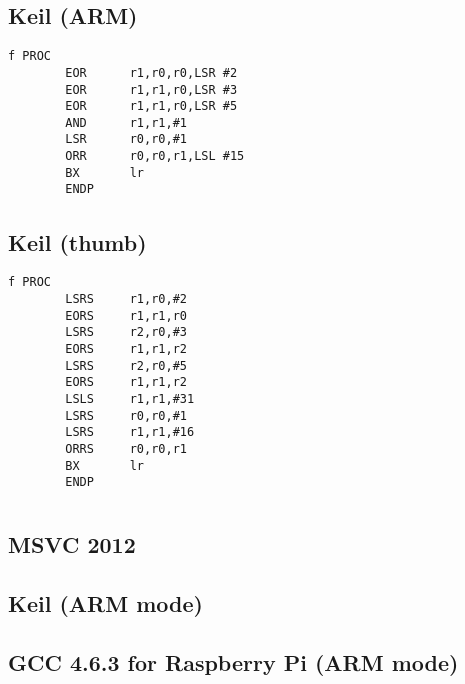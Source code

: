 \subsection{Keil (ARM)}

\begin{lstlisting}
f PROC
        EOR      r1,r0,r0,LSR #2
        EOR      r1,r1,r0,LSR #3
        EOR      r1,r1,r0,LSR #5
        AND      r1,r1,#1
        LSR      r0,r0,#1
        ORR      r0,r0,r1,LSL #15
        BX       lr
        ENDP
\end{lstlisting}

\subsection{Keil (thumb)}

\begin{lstlisting}
f PROC
        LSRS     r1,r0,#2
        EORS     r1,r1,r0
        LSRS     r2,r0,#3
        EORS     r1,r1,r2
        LSRS     r2,r0,#5
        EORS     r1,r1,r2
        LSLS     r1,r1,#31
        LSRS     r0,r0,#1
        LSRS     r1,r1,#16
        ORRS     r0,r0,r1
        BX       lr
        ENDP
\end{lstlisting}

\section{}


\subsection{MSVC 2012}



\subsection{Keil (ARM mode)}



\subsection{GCC 4.6.3 for Raspberry Pi (ARM mode)}

